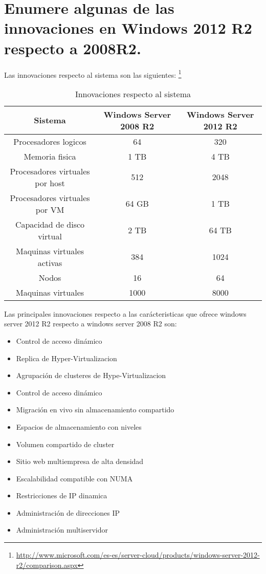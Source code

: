 \section{Enumere algunas de las innovaciones en Windows 2012 R2 respecto a 2008R2.}
Las innovaciones respecto al sistema son las siguientes: \footnote{\url{http://www.microsoft.com/es-es/server-cloud/products/windows-server-2012-r2/comparison.aspx}}
\begin{table}[H]
\centering
\begin{tabular}{|c|c|c|}
\hline
{\bf Sistema} & {\bf Windows Server 2008 R2} & {\bf Windows Server 2012 R2} \\
\hline
Procesadores logicos & 64 & 320 \\
\hline
Memoria fisica & 1 TB & 4 TB \\
\hline
Procesadores virtuales por host & 512 & 2048 \\
\hline
Procesadores virtuales por VM & 64 GB & 1 TB \\
\hline
Capacidad de disco virtual & 2 TB & 64 TB \\
\hline
Maquinas virtuales activas & 384 & 1024 	\\
\hline
Nodos & 16 & 64 \\
\hline
Maquinas virtuales & 1000 & 8000\\
\hline
\end{tabular}  
\caption{Innovaciones respecto al sistema} \label{tab:}
\end{table}

Las principales innovaciones respecto a las carácteristicas que ofrece windows server 2012 R2 respecto a windows server 2008 R2 son:
\begin{itemize}
\item Control de acceso dinámico
\item Replica de Hyper-Virtualizacion
\item Agrupación de clusteres de Hype-Virtualizacion
\item Control de acceso dinámico
\item Migración en vivo sin almacenamiento compartido
\item Espacios de almacenamiento con niveles
\item Volumen compartido de cluster
\item Sitio web multiempresa de alta densidad
\item Escalabilidad compatible con NUMA
\item Restricciones de IP dinamica
\item Administración de direcciones IP
\item Administración multiservidor
\end{itemize}
\newpage
